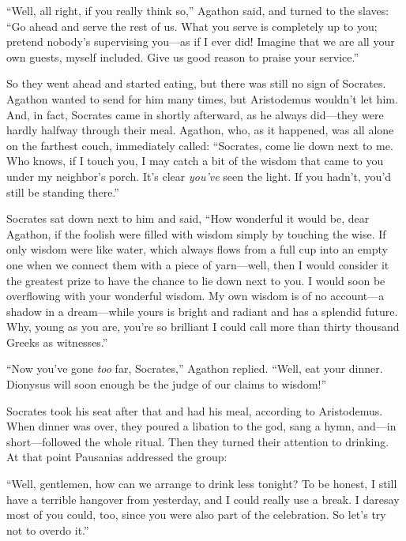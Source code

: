 “Well, all right, if you really think so,” Agathon said, and turned to
the slaves: “Go ahead and serve the rest of us. What you serve is
completely up to you; pretend nobody's supervising you---as if I ever
did! Imagine that we are all your own guests, myself included. Give us
good reason to praise your service.”

So they went ahead and started eating, but there was still no sign of
Socrates. Agathon wanted to send for him many times, but Aristodemus
wouldn't let him. And, in fact, Socrates came in shortly afterward, as
he always did---they were hardly halfway through their meal. Agathon,
who, as it happened, was all alone on the farthest couch, immediately
called: “Socrates, come lie down next to me. Who knows, if I touch you,
I may catch a bit of the wisdom that came to you under my
neighbor's porch. It's clear {\em you've} seen the light. If you hadn't,
you'd still be standing there.”

Socrates sat down next to him and said, “How wonderful it would be, dear
Agathon, if the foolish were filled with wisdom simply by touching the
wise. If only wisdom were like water, which always flows from a full cup
into an empty one when we connect them with a piece of yarn---well, 
then I would consider it the greatest prize to have the chance
to lie down next to you. I would soon be overflowing with your wonderful
wisdom. My own wisdom is of no account---a shadow in a dream---while
yours is bright and radiant and has a splendid future. Why, young as you
are, you're so brilliant I could call more than thirty thousand Greeks
as witnesses.”

“Now you've gone {\em too} far, Socrates,” Agathon replied. “Well, eat
your dinner. Dionysus will soon enough be the judge of our claims to
wisdom!”

Socrates took his seat after that and had his meal, according to
Aristodemus. When dinner was over, they poured a libation to the god,
sang a hymn, and---in short---followed the whole ritual. Then they
turned their attention to drinking. At that point Pausanias addressed
the group:

“Well, gentlemen, how can we arrange to drink less tonight? To be
honest, I still have a terrible hangover from yesterday, and I could
really use a break. I daresay most of you could, too, since you were
also part of the celebration. So let's try not to overdo it.”

